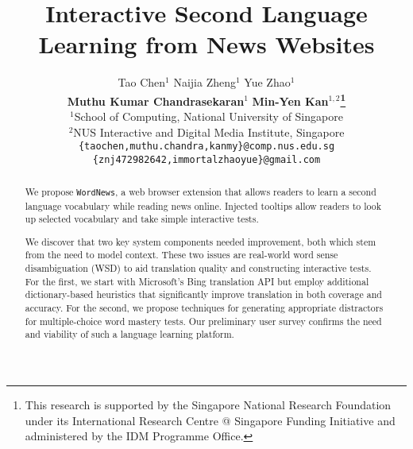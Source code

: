\documentclass[11pt]{article}
\title{Interactive Second Language Learning from News Websites}
\author{
  	Tao Chen$^{1}$\qquad 
  	Naijia Zheng$^{1}$\qquad
  	Yue Zhao$^{1}$ \\
  	{\bf Muthu Kumar Chandrasekaran$^{1}$}\qquad 
  	{\bf Min-Yen Kan$^{1,2}$\thanks{\hspace{.2cm}This research is supported by the Singapore National Research Foundation under its International Research Centre @ Singapore Funding Initiative and administered by the IDM Programme Office.}}\\ 
  	$^{1}$School of Computing, National University of Singapore\\
  	$^{2}$NUS Interactive and Digital Media Institute, Singapore\\
  	{\tt \{taochen,muthu.chandra,kanmy\}@comp.nus.edu.sg}  \\ 
  	{\tt \{znj472982642,immortalzhaoyue\}@gmail.com}}
\date{}
\begin{document}
\maketitle
\begin{abstract}


We propose {\tt WordNews}, a web browser extension that allows readers to learn a
second language vocabulary while reading news online.  Injected
tooltips allow readers to look up selected vocabulary and take simple
interactive tests.

We discover that two key system components needed improvement, both
which stem from the need to model context.  These two issues are
real-world word sense disambiguation (WSD) to aid translation quality
and constructing interactive tests. For the first, we start with
Microsoft's Bing translation API but employ additional
dictionary-based heuristics that significantly improve translation in
both coverage and accuracy. For the second, we propose techniques for
generating appropriate distractors for multiple-choice word mastery
tests.  Our preliminary user survey confirms the need and viability of
such a language learning platform.

\end{abstract}









%
%



\end{document}
